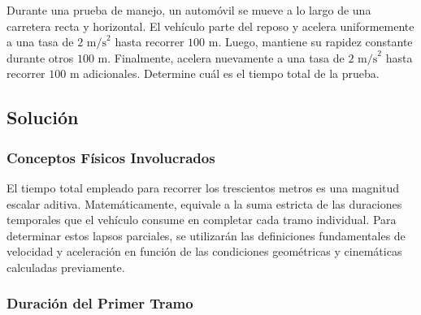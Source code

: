 \documentclass[12pt, a4paper]{article}
\begin{document}
Durante una prueba de manejo, un automóvil se mueve a lo largo de una carretera recta y horizontal. El vehículo parte del reposo y acelera uniformemente a una tasa de $2 \text{ m/s}^2$ hasta recorrer $100 \text{ m}$. Luego, mantiene su rapidez constante durante otros $100 \text{ m}$. Finalmente, acelera nuevamente a una tasa de $2 \text{ m/s}^2$ hasta recorrer $100 \text{ m}$ adicionales. Determine cuál es el tiempo total de la prueba.

\vspace{0.5cm}

\begin{center}
\end{center}

\subsection*{Solución}

\subsubsection*{Conceptos Físicos Involucrados}

El tiempo total empleado para recorrer los trescientos metros es una magnitud escalar aditiva. Matemáticamente, equivale a la suma estricta de las duraciones temporales que el vehículo consume en completar cada tramo individual. Para determinar estos lapsos parciales, se utilizarán las definiciones fundamentales de velocidad y aceleración en función de las condiciones geométricas y cinemáticas calculadas previamente.

\subsubsection*{Duración del Primer Tramo}
\end{document}
